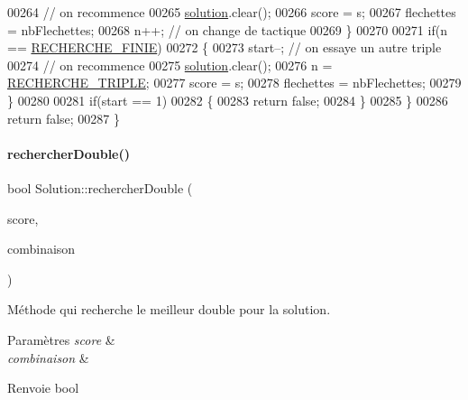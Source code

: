 \begin{DoxyCode}
00264             \textcolor{comment}{// on recommence}
00265             \hyperlink{class_solution_a03b47dedfe8a8f8244f7e633cbaa30fb}{solution}.clear();
00266             score = s;
00267             flechettes = nbFlechettes;
00268             n++; \textcolor{comment}{// on change de tactique}
00269         \}
00270 
00271         \textcolor{keywordflow}{if}(n == \hyperlink{solution_8h_a40ef173938ecf3bea081d59950fedce7}{RECHERCHE\_FINIE})
00272         \{
00273             start--; \textcolor{comment}{// on essaye un autre triple}
00274             \textcolor{comment}{// on recommence}
00275             \hyperlink{class_solution_a03b47dedfe8a8f8244f7e633cbaa30fb}{solution}.clear();
00276             n = \hyperlink{solution_8h_a911c709f6e0d892d5aa2c1da0d3f2d02}{RECHERCHE\_TRIPLE};
00277             score = s;
00278             flechettes = nbFlechettes;
00279         \}
00280 
00281         \textcolor{keywordflow}{if}(start == 1)
00282         \{
00283             \textcolor{keywordflow}{return} \textcolor{keyword}{false};
00284         \}
00285     \}
00286     \textcolor{keywordflow}{return} \textcolor{keyword}{false};
00287 \}
\end{DoxyCode}
\mbox{\label{class_solution_aa54574bee5bde60d55a9da346a61cf48}} 
\paragraph{\texorpdfstring{rechercher\+Double()}{rechercherDouble()}}
{\footnotesize\ttfamily bool Solution\+::rechercher\+Double (\begin{DoxyParamCaption}\item[{int \&}]{score,  }\item[{Q\+String \&}]{combinaison }\end{DoxyParamCaption})\hspace{0.3cm}{\ttfamily [private]}}



Méthode qui recherche le meilleur double pour la solution. 


\begin{DoxyParams}{Paramètres}
{\em score} & \\
\hline
{\em combinaison} & \\
\hline
\end{DoxyParams}
\begin{DoxyReturn}{Renvoie}
bool 
\end{DoxyReturn}


